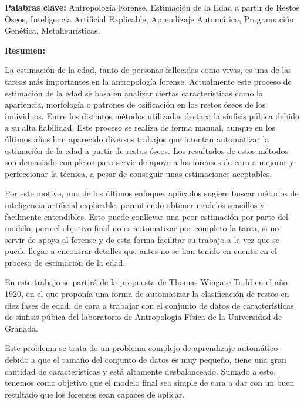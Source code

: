 \clearpage
\begin{center}
	{\large\textbf{\thetitle}}


	\theauthor
\end{center}

\textbf{Palabras clave:} Antropología Forense, Estimación de la Edad a partir de Restos Óseos, Inteligencia Artificial Explicable,
Aprendizaje Automático, Programación Genética, Metaheurísticas.

\textbf{Resumen:}

La estimación de la edad, tanto de personas fallecidas como vivas, es una de las tareas más importantes en la antropología forense. Actualmente este proceso de estimación de la edad se basa en analizar ciertas características como la apariencia, morfología o patrones de osificación en los restos óseos de los individuos. Entre los distintos métodos utilizados destaca la sínfisis púbica debido a su alta fiabilidad. Este proceso se realiza de forma manual, aunque en los últimos años han aparecido diversos trabajos que intentan automatizar la estimación de la edad a partir de restos óseos. Los resultados de estos métodos son demasiado complejos para servir de apoyo a los forenses de cara a mejorar y perfeccionar la técnica, a pesar de conseguir unas estimaciones aceptables.

Por este motivo, uno de los últimos enfoques aplicados sugiere buscar métodos de inteligencia artificial explicable, permitiendo obtener modelos sencillos y facilmente entendibles. Esto puede conllevar una peor estimación por parte del modelo, pero el objetivo final no es automatizar por completo la tarea, si no servir de apoyo al forense y de esta forma facilitar su trabajo a la vez que se puede llegar a encontrar detalles que antes no se han tenido en cuenta en el proceso de estimación de la edad.

En este trabajo se partirá de la propuesta de Thomas Wingate Todd en el año 1920, en el que proponía una forma de automatizar la clasificación de restos en diez fases de edad, de cara a trabajar con el conjunto de datos de características de sínfisis púbica del laboratorio de Antropología Física de la Universidad de Granada.

Este problema se trata de un problema complejo de aprendizaje automático debido a que el tamaño del conjunto de datos es muy pequeño, tiene una gran cantidad de características y está altamente desbalanceado. Sumado a esto, tenemos como objetivo que el modelo final sea simple de cara a dar con un buen resultado que los forenses sean capaces de aplicar.

